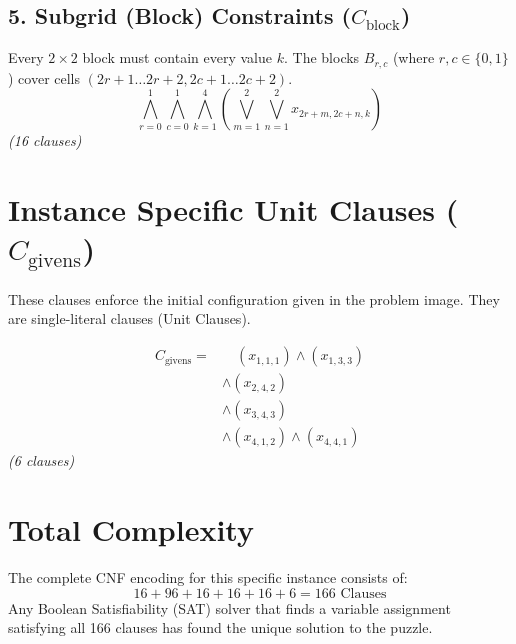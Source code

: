 \documentclass[12pt,a4paper]{article}
\begin{document}
\subsection{5. Subgrid (Block) Constraints ($C_{\text{block}}$)}
Every $2 \times 2$ block must contain every value $k$. The blocks $B_{r,c}$ (where $r,c \in \{0,1\}$) cover cells $(2r+1 \dots 2r+2, 2c+1 \dots 2c+2)$.
$$ \bigwedge_{r=0}^1 \bigwedge_{c=0}^1 \bigwedge_{k=1}^4 \left( \bigvee_{m=1}^2 \bigvee_{n=1}^2 x_{2r+m, 2c+n, k} \right) $$
\textit{(16 clauses)}

\section{Instance Specific Unit Clauses ($C_{\text{givens}}$)}
These clauses enforce the initial configuration given in the problem image. They are single-literal clauses (Unit Clauses).

\begin{align*}
    C_{\text{givens}} = & \quad (x_{1,1,1}) \land (x_{1,3,3}) \\
    & \land (x_{2,4,2}) \\
    & \land (x_{3,4,3}) \\
    & \land (x_{4,1,2}) \land (x_{4,4,1})
\end{align*}
\textit{(6 clauses)}

\section{Total Complexity}
The complete CNF encoding for this specific instance consists of:
$$ 16 + 96 + 16 + 16 + 16 + 6 = 166 \text{ Clauses} $$
Any Boolean Satisfiability (SAT) solver that finds a variable assignment satisfying all 166 clauses has found the unique solution to the puzzle.
\end{document}
